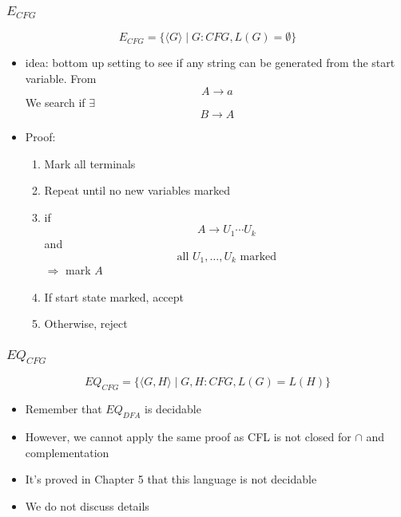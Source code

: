 \begin{frame}[allowframebreaks]
\begin{itemize}
\end{itemize}\end{frame} \begin{frame}[allowframebreaks] \frametitle{$E_{CFG}$}
\begin{equation*}
  E_{CFG}
=\{\langle  G\rangle \mid
G: CFG, L(G)=\emptyset\}
\end{equation*}
  \begin{itemize}
  \item idea: bottom up setting to see if any string can be generated
    from the start variable. From
  \begin{equation*}
    A\rightarrow a
  \end{equation*}
  We search if $\exists$
\begin{equation*}
  B\rightarrow A
\end{equation*}

\item Proof:
  \begin{enumerate}
  \item Mark all terminals
  \item Repeat until no new variables marked

  \item [] \quad if
    \begin{equation*}
    A\rightarrow U_1\cdots U_k
  \end{equation*}
   \quad and 
   \begin{equation*}
\text{all }    U_1, \ldots, U_k \text{ marked}
 \end{equation*}
\quad $\Rightarrow$  mark $A$
\item If start state marked, accept
\item [] Otherwise, reject
  \end{enumerate}
\end{itemize}\end{frame} \begin{frame}[allowframebreaks] \frametitle{$EQ_{CFG}$}
\begin{equation*}
  EQ_{CFG}
=\{\langle  G,H\rangle \mid G,H: CFG, L(G)=
L(H)\}
\end{equation*}
  \begin{itemize}
\item Remember that $EQ_{DFA}$ is decidable
\item However, we cannot apply the same proof as
 CFL is not closed for 
$\cap$ and complementation
\item It's proved in Chapter 5 that this language is not decidable
\item We do not discuss details
\end{itemize}\end{frame}

